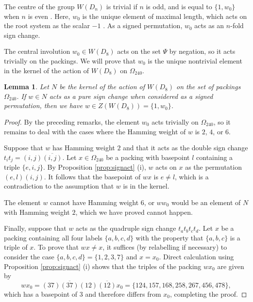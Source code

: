 \documentclass{amsart}
\theoremstyle{plain}
\newtheorem{lemma}[theorem]{Lemma}
\theoremstyle{definition}
\theoremstyle{remark}
\numberwithin{equation}{section}
\newcommand{\qpx}{\Omega_{240}}
\begin{document}
The centre of the group $W(D_n)$ is trivial if $n$ is odd, and is equal to $\{1, w_0\}$ when $n$ is even
\cite[\S6.3]{humphreys90}. Here, $w_0$ is the unique element of maximal length, which acts on the root 
system as the scalar $-1$ \cite[\S3.19]{humphreys90}. As a signed permutation, $w_0$ acts as an $n$-fold
sign change. 

The central involution $w_0 \in W(D_8)$ acts on the set $\Psi$ by negation, so it acts trivially on the
packings. We will prove that $w_0$ is the unique nontrivial element in the kernel of the action of
$W(D_8)$ on $\qpx$.

\begin{lemma}\label{lem:signkernel}
Let $N$ be the kernel of the action of $W(D_8)$ on the set of packings $\qpx$. If $w \in N$ acts as a pure
sign change when considered as a signed permutation, then we have $w \in Z(W(D_8)) = \{1, w_0\}$.
\end{lemma}

\begin{proof}
By the preceding remarks, the element $w_0$ acts trivially on $\qpx$, so it remains to deal with the cases
where the Hamming weight of $w$ is $2$, $4$, or $6$.

Suppose that $w$ has Hamming weight $2$ and that it acts as the double sign change 
$t_it_j = (i, j)\overline{(i, j)}$. Let $x \in \qpx$ be a packing with basepoint $l$ containing a triple 
$\{e, i, j\}$. By Proposition \ref{prop:signact} (i), $w$ acts on $x$ as the permutation $(e, l)(i, j)$. It follows
that the basepoint of $wx$ is $e \ne l$, which is a contradiction to the assumption that $w$ is in the kernel.

The element $w$ cannot have Hamming weight $6$, or $ww_0$ would be an element of $N$ with Hamming weight $2$, 
which we have proved cannot happen.

Finally, suppose that $w$ acts as the quadruple sign change $t_at_bt_ct_d$. Let $x$ be a packing containing 
all four labels $\{a, b, c, d\}$ with the property that $\{a, b, c\}$ is a triple of $x$. To prove that 
$wx \ne x$, it suffices (by relabelling if necessary) to consider the case $\{a, b, c, d\} = \{1, 2, 3, 7\}$ 
and $x = x_0$. Direct calculation using Proposition \ref{prop:signact} (i) shows that the triples of the packing $wx_0$ 
are given by $$
wx_0 = (3 7) \overline{(3 7)} (1 2) \overline{(1 2)} x_0
= \{124, 157, 168, 258, 267, 456, 478\}
,$$ which has a basepoint of $3$ and therefore differs from $x_0$, completing the proof.
\end{proof}
\end{document}
